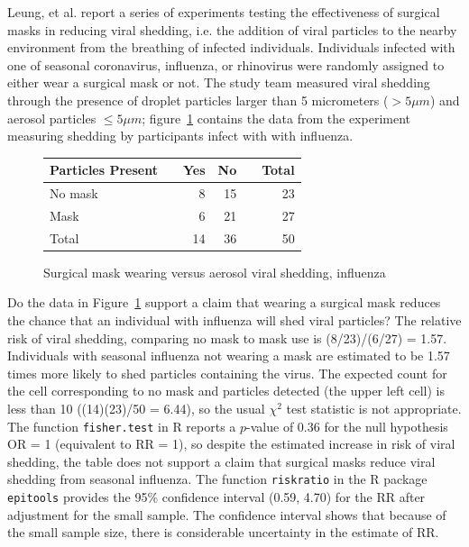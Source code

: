 Leung, et al. report a series of experiments testing the effectiveness of surgical masks in reducing viral shedding, i.e. the addition of viral particles to the nearby environment from the breathing of infected individuals.  Individuals infected with one of seasonal coronavirus, influenza, or rhinovirus were randomly assigned to either wear a surgical mask or not.  The study team measured viral shedding through the presence of droplet particles larger than 5 micrometers ($> 5\mu m$) and aerosol particles $\leq 5\mu m$; figure~\ref{figure:influenzaAerosolViralShedding} contains the data from the experiment measuring shedding by participants infect with with influenza. 
\begin{figure}[h]
	\centering
	\begin{tabular}{ll rrr r}
		\hline
		Particles Present	& \hspace{2mm} & Yes & No & \hspace{2mm} & Total \\
		\hline
        No mask & & 8 & 15 & & 23    \\
        Mask &	& 6 & 21 & & 27    \\
        Total & & 14 & 36 & & 50 \\
		\hline
	\end{tabular}
	\caption{Surgical mask wearing versus aerosol viral shedding, influenza}
    \label{figure:influenzaAerosolViralShedding}
\end{figure}	

\begin{examplewrap}
  \begin{nexample}{Do the data in Figure~\ref{figure:influenzaAerosolViralShedding} support a claim that wearing a surgical mask reduces the chance that an individual with influenza will shed viral particles?} 
    The relative risk of viral shedding, comparing no mask to mask use is (8/23)/(6/27) = 1.57.  Individuals with seasonal influenza not wearing a mask are estimated to be 1.57 times more likely to shed particles containing the virus. The expected count for the cell corresponding to no mask and particles detected (the upper left cell) is less than 10 ((14)(23)/50 = 6.44), so the usual $\chi^2$ test statistic is not appropriate.  The function \texttt{fisher.test} in \textsf{R} reports a $p$-value of 0.36 for the null hypothesis OR = 1 (equivalent to RR = 1), so despite the estimated increase in risk of viral shedding, the table does not support a claim that surgical masks reduce viral shedding from seasonal influenza.  The function \texttt{riskratio} in the \textsf{R} package \texttt{epitools} provides the 95\% confidence interval (0.59, 4.70) for the RR after adjustment for the small sample.  The confidence interval shows that because of the small sample size, there is considerable uncertainty in the estimate of RR.

  \end{nexample}
\end{examplewrap}

